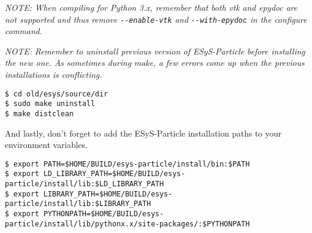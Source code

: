 \emph{NOTE: When compiling for Python 3.x, remember that  both vtk and epydoc are not supported and thus remove \lstinline{--enable-vtk} and \lstinline{--with-epydoc} in the configure command.}

\emph{NOTE: Remember to uninstall previous version of ESyS-Particle before installing the new one. As sometimes during make, a few errors come up when the previous installations is conflicting.}
\begin{lstlisting}[style=inlineBash]
$ cd old/esys/source/dir
$ sudo make uninstall
$ make distclean
\end{lstlisting}

And lastly, don't forget to add the ESyS-Particle installation paths to your environment variables.

\begin{lstlisting}[style=inlineBash]
$ export PATH=$HOME/BUILD/esys-particle/install/bin:$PATH
$ export LD_LIBRARY_PATH=$HOME/BUILD/esys-particle/install/lib:$LD_LIBRARY_PATH
$ export LIBRARY_PATH=$HOME/BUILD/esys-particle/install/lib:$LIBRARY_PATH
$ export PYTHONPATH=$HOME/BUILD/esys-particle/install/lib/pythonx.x/site-packages/:$PYTHONPATH
\end{lstlisting}
